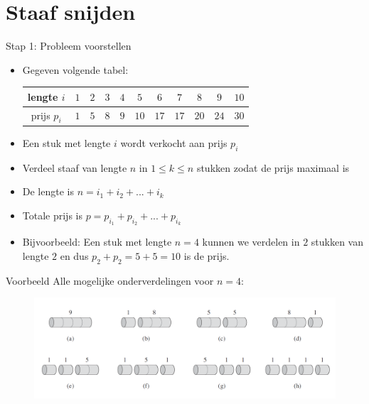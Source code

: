 \documentclass
   [kulak] %
   {kulakbeamer}
\begin{document}
\section{Staaf snijden}

\begin{frame}{Stap 1: Probleem voorstellen}
    \begin{itemize}
        \item<1-> Gegeven volgende tabel:
        \begin{table}[h]
            \centering
            \begin{tabular}{c|cccccccccc}
                lengte $i$ & $1$ & $2$ & $3$ & $4$ & $5$ & $6$ & $7$ & $8$ & $9$ & $10$ \\
                \hline
                prijs $p_i$ & $1$ & $5$ & $8$ & $9$ & $10$ & $17$ & $17$ & $20$ & $24$ & $30$
            \end{tabular}
        \end{table}
        \item<1-> Een stuk met lengte $i$ wordt verkocht aan prijs $p_i$
        \item<2-> Verdeel staaf van lengte $n$ in $1 \leq k\leq n$ stukken zodat de prijs maximaal is
        \item<3-> De lengte is $n = i_1 + i_2 + ... + i_k$
        \item<4-> Totale prijs is $p = p_{i_1} + p_{i_2} + ... + p_{i_k}$
        \item<5-> Bijvoorbeeld: Een stuk met lengte $n = 4$ kunnen we verdelen in $2$ stukken van lengte $2$ en dus $p_2 + p_2 = 5 + 5 = 10$ is de prijs.
    \end{itemize}
\end{frame}

\begin{frame}{Voorbeeld}
    Alle mogelijke onderverdelingen voor $n = 4$:
    \begin{figure}
        \centering
        \includegraphics[width=\linewidth]{rodcuttingn4.png}
    \end{figure}  
\end{frame}
\end{document}
